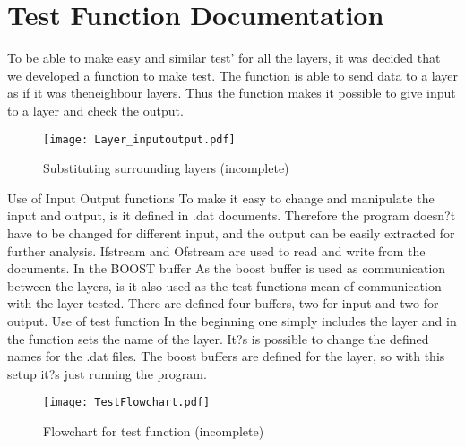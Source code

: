 \section{Test Function Documentation}
To be able to make easy and similar test' for all the layers, it was decided that we developed a function to make test. The function is able to send data to a layer as if it was theneighbour layers. Thus the function makes it possible to give input to a layer and check the output.

\begin{figure}[htb]
	\begin{center}
	\texttt{[image: Layer\_inputoutput.pdf]}
	\caption{Substituting surrounding layers (incomplete)}
	\label{fig:Layer_inputoutput}	
	\end{center}
\end{figure}

Use of Input Output functions
To make it easy to change and manipulate the input and output, is it defined in .dat documents. Therefore the program doesn?t have to be changed for different input, and the output can be easily extracted for further analysis. Ifstream and Ofstream are used to read and write from the documents. In the 
BOOST buffer
As the boost buffer is used as communication between the layers, is it also used as the test functions mean of communication with the layer tested. There are defined four buffers, two for input and two for output.
Use of test function
In the beginning one simply includes the layer and in the function sets the name of the layer. It?s is possible to change the defined names for the .dat files. The boost buffers are defined for the layer, so with this setup it?s just running the program.

\begin{figure}[htb]
	\begin{center}
	\texttt{[image: TestFlowchart.pdf]}
	\caption{Flowchart for test function (incomplete)}
	\label{fig:TestFlowchart}	
	\end{center}
\end{figure}

